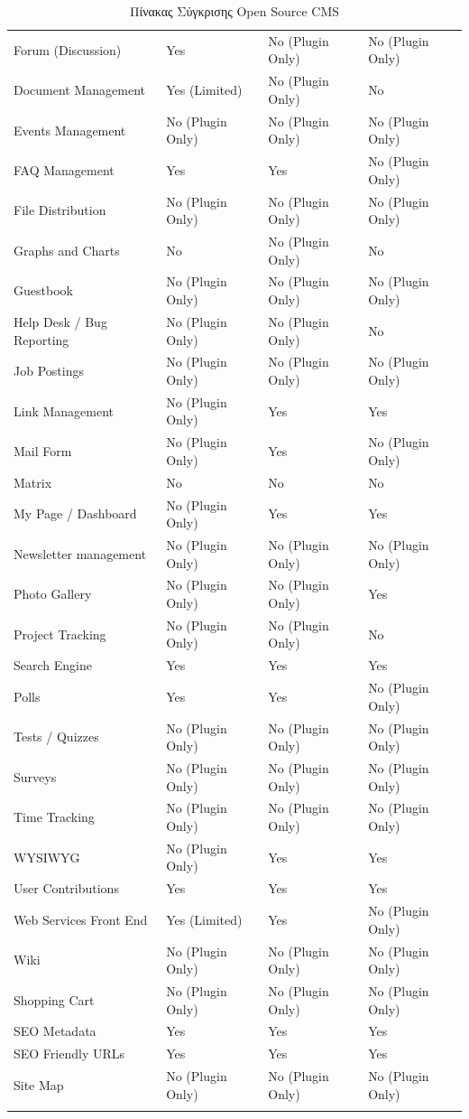 \documentclass[12pt]{report}
\begin{document}
\begin{itemize}
\begin{longtable}[H]{|| p{.3\linewidth} | p{.19\linewidth} | p{.19\linewidth} | p{.19\linewidth} ||}
Forum (Discussion) & Yes & No (Plugin Only) & No (Plugin Only) \\
Document Management & Yes (Limited) & No (Plugin Only) & No \\
Events Management & No (Plugin Only) & No (Plugin Only) & No (Plugin Only) \\
FAQ Management & Yes & Yes & No (Plugin Only) \\
File Distribution & No (Plugin Only) & No (Plugin Only) & No (Plugin Only) \\
Graphs and Charts & No & No (Plugin Only) & No \\
Guestbook & No (Plugin Only) & No (Plugin Only) & No (Plugin Only) \\
Help Desk / Bug Reporting & No (Plugin Only) & No (Plugin Only) & No \\
Job Postings & No (Plugin Only) & No (Plugin Only) & No (Plugin Only) \\
Link Management & No (Plugin Only) & Yes & Yes \\
Mail Form & No (Plugin Only) & Yes & No (Plugin Only) \\
Matrix & No & No & No \\
My Page / Dashboard & No (Plugin Only) & Yes & Yes \\
Newsletter management & No (Plugin Only) & No (Plugin Only) & No (Plugin Only) \\
Photo Gallery & No (Plugin Only) & No (Plugin Only) & Yes \\
Project Tracking & No (Plugin Only) & No (Plugin Only) & No \\
Search Engine & Yes & Yes & Yes \\
Polls & Yes & Yes & No (Plugin Only) \\
Tests / Quizzes & No (Plugin Only) & No (Plugin Only) & No (Plugin Only) \\
Surveys & No (Plugin Only) & No (Plugin Only) & No (Plugin Only) \\
Time Tracking & No (Plugin Only) & No (Plugin Only) & No (Plugin Only) \\
WYSIWYG & No (Plugin Only) & Yes & Yes \\
User Contributions & Yes & Yes & Yes \\
Web Services Front End & Yes (Limited) & Yes & No (Plugin Only) \\
Wiki & No (Plugin Only) & No (Plugin Only) & No (Plugin Only) \\
Shopping Cart & No (Plugin Only) & No (Plugin Only) & No (Plugin Only) \\
SEO Metadata & Yes & Yes & Yes \\
SEO Friendly URLs & Yes & Yes & Yes \\
Site Map & No (Plugin Only) & No (Plugin Only) & No (Plugin Only) \\
\hline
\caption{\textgreek{Πίνακας Σύγκρισης} Open Source CMS}
\label{tab01}
\end{longtable}
\normalsize
{}


\end{itemize}
\end{document}
